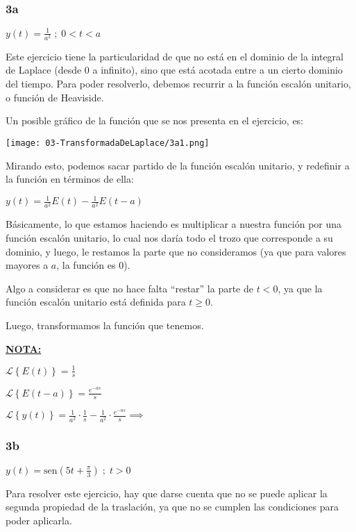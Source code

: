 \documentclass[11pt]{article}
\def\sen{\mathrm{sen}}
\newcommand{\lapl}[1]{\mathscr{L} \left\lbrace {#1} \right\rbrace}
\begin{document}
    \subsubsection{3a}
    $\displaystyle y(t)=\frac{1}{a^{2}} \;;\;0<t<a$
    
    Este ejercicio tiene la particularidad de que no está en el dominio de la integral de Laplace (desde 0 a infinito), sino que está acotada entre a un cierto dominio del tiempo. Para poder resolverlo, debemos recurrir a la función escalón unitario, o función de Heaviside.
    
    Un posible gráfico de la función que se nos presenta en el ejercicio, es:
    
    \texttt{[image: 03-TransformadaDeLaplace/3a1.png]}
    
    Mirando esto, podemos sacar partido de la función escalón unitario, y redefinir a la función en términos de ella:
    
    $\displaystyle y(t)=\frac{1}{a^{2}}E(t)-\frac{1}{a^{2}}E(t-a)$
    
    Básicamente, lo que estamos haciendo es multiplicar a nuestra función por una función escalón unitario, lo cual nos daría todo el trozo que corresponde a su dominio, y luego, le restamos la parte que no consideramos (ya que para valores mayores a $a$, la función es 0).
    
    Algo a considerar es que no hace falta ``restar'' la parte de $t<0$, ya que la función escalón unitario está definida para $t \geq 0$.
    
    Luego, transformamos la función que tenemos. 
    
    \textbf{\underline{NOTA:}} 
    
    $\displaystyle \lapl{E(t)}=\frac{1}{s}$
    
    $\displaystyle \lapl{E(t-a)}=\frac{e^{-as}}{s}$
    
    $\displaystyle \lapl{y(t)}=\frac{1}{a^{2}} \cdot \frac{1}{s}- \frac{1}{a^{2}} \cdot \frac{e^{-as}}{s} \implies$
    
    \subsubsection{3b}
    $y(t)=\sen \left(5t+\frac{\pi}{3} \right)\;;\;t>0$
    
    Para resolver este ejercicio, hay que darse cuenta que no se puede aplicar la segunda propiedad de la traslación, ya que no se cumplen las condiciones para poder aplicarla.
    
\end{document}
